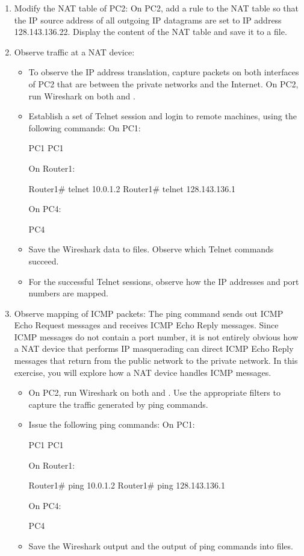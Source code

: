 \begin{enumerate}
	\item Modify the NAT table of PC2: On PC2, add a rule to the NAT table so that the IP source address of all outgoing IP datagrams are set to IP address 128.143.136.22. Display the content of the NAT table and save it to a file.
	\item Observe traffic at a NAT device:
		\begin{itemize}
			\item To observe the IP address translation, capture packets on both interfaces of PC2 that are between the private networks and the Internet. On PC2, run Wireshark on both  and .
			\item Establish a set of Telnet session and login to remote machines, using the following  commands:
				On PC1:
				\begin{cmdblock}
	PC1%
	PC1%
				\end{cmdblock}
				On Router1:
				\begin{cmdblock}
	Router1# telnet 10.0.1.2
	Router1# telnet 128.143.136.1
				\end{cmdblock}
				On PC4:
				\begin{cmdblock}
	PC4%
				\end{cmdblock}
			\item Save the Wireshark data to files. Observe which Telnet commands succeed.
			\item For the successful Telnet sessions, observe how the IP addresses and port numbers are mapped.
		\end{itemize}
	\item Observe mapping of ICMP packets: The ping command sends out ICMP Echo Request messages and receives ICMP Echo Reply messages. Since ICMP messages do not contain a port number, it is not entirely obvious how a NAT device that performs IP masquerading can direct ICMP Echo Reply messages that return from the public network to the private network. In this exercise, you will explore how a NAT device handles ICMP messages.
		\begin{itemize}
			\item On PC2, run Wireshark on both  and . Use the appropriate filters to capture the traffic generated by ping commands.
			\item Issue the following ping commands:
				On PC1:
				\begin{cmdblock}
	PC1%
	PC1%
				\end{cmdblock}
				On Router1:
				\begin{cmdblock}
	Router1# ping 10.0.1.2
	Router1# ping 128.143.136.1
				\end{cmdblock}
				On PC4:
				\begin{cmdblock}
	PC4%
				\end{cmdblock}
			\item Save the Wireshark output and the output of ping commands into files.
		\end{itemize}
\end{enumerate}

